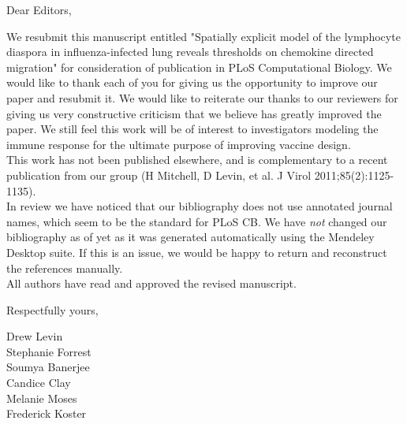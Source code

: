 \documentclass[10pt]{article}
\date{}
\begin{document}
\begin{flushleft}Dear Editors, \end{flushleft} 

We resubmit this manuscript entitled "Spatially explicit model of the lymphocyte diaspora in influenza-infected lung reveals thresholds on chemokine directed migration" for consideration of publication in PLoS Computational Biology.  We would like to thank each of you for giving us the opportunity to improve our paper and resubmit it.  We would like to reiterate our thanks to our reviewers for giving us very constructive criticism that we believe has greatly improved the paper.  We still feel this work will be of interest to investigators modeling the immune response for the ultimate purpose of improving vaccine design.  \\

This work has not been published elsewhere, and is complementary to a recent publication from our group (H Mitchell, D Levin, et al. J Virol 2011;85(2):1125-1135). \\

In review we have noticed that our bibliography does not use annotated journal names, which seem to be the standard for PLoS CB.  We have {\em not} changed our bibliography as of yet as it was generated automatically using the Mendeley Desktop suite.  If this is an issue, we would be happy to return and reconstruct the references manually. \\

All authors have read and approved the revised manuscript. 

\begin{flushleft}Respectfully yours,\end{flushleft}
Drew Levin \\
Stephanie Forrest \\
Soumya Banerjee \\
Candice Clay \\
Melanie Moses \\
Frederick Koster
\end{document}
